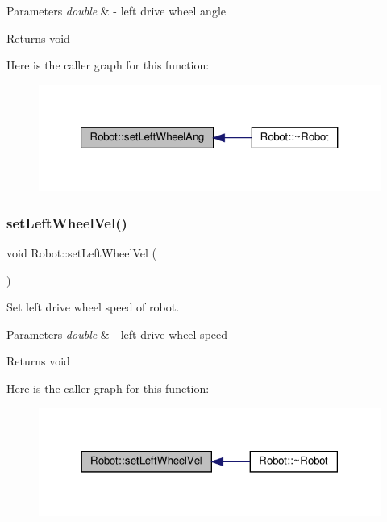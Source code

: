 \begin{DoxyParams}{Parameters}
{\em double} & -\/ left drive wheel angle \\
\hline
\end{DoxyParams}
\begin{DoxyReturn}{Returns}
void 
\end{DoxyReturn}
Here is the caller graph for this function\+:
\nopagebreak
\begin{figure}[H]
\begin{center}
\leavevmode
\includegraphics[width=321pt]{classRobot_adbe4d758d302d3fa70fedf5af9c82afc_icgraph}
\end{center}
\end{figure}
\mbox{\label{classRobot_ab86642effe20a530827e4c2fc457ddb4}} 
\subsubsection{\texorpdfstring{set\+Left\+Wheel\+Vel()}{setLeftWheelVel()}}
{\footnotesize\ttfamily void Robot\+::set\+Left\+Wheel\+Vel (\begin{DoxyParamCaption}\item[{double}]{ }\end{DoxyParamCaption})}



Set left drive wheel speed of robot. 


\begin{DoxyParams}{Parameters}
{\em double} & -\/ left drive wheel speed \\
\hline
\end{DoxyParams}
\begin{DoxyReturn}{Returns}
void 
\end{DoxyReturn}
Here is the caller graph for this function\+:
\nopagebreak
\begin{figure}[H]
\begin{center}
\leavevmode
\includegraphics[width=318pt]{classRobot_ab86642effe20a530827e4c2fc457ddb4_icgraph}
\end{center}
\end{figure}
\mbox{\label{classRobot_a3d7a12ec4cd50436d46363de93a4f9b2}} 
